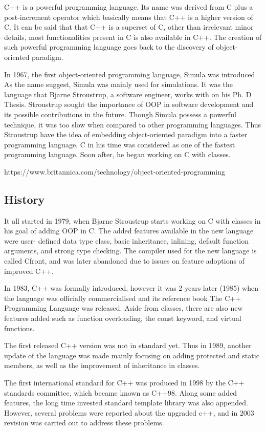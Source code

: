 \documentclass[a4paper, 12pt]{article}
\begin{document}
C++ is a powerful programming language. Its name was derived from C plus a post-increment operator which basically means that C++ is a higher version of C. It can be said that that C++ is a superset of C, other than irrelevant minor details, most functionalities present in C is also available in C++.  The creation of such powerful programming language goes back to the discovery of object-oriented paradigm.  

In 1967, the first object-oriented programming language, Simula was introduced. As the name suggest, Simula was mainly used for simulations. It was the language that Bjarne Stroustrup, a software engineer, works with on his Ph. D Thesis. Stroustrup sought the importance of OOP in software development and its possible contributions in the future. Though Simula possess a powerful technique, it was too slow when compared to other programming languages. Thus Stroustrup have the idea of embedding object-oriented paradigm into a faster programming language. C in his time was considered as one of the fastest programming language. Soon after, he began working on C with classes. 


https://www.britannica.com/technology/object-oriented-programming
\subsection{History}
It all started in 1979, when Bjarne Stroustrup starts working on C with classes in his goal of adding OOP in C. The added features available in the new language were user- defined data type class, basic inheritance, inlining, default function arguments, and strong type checking. The compiler used for the new language is called Cfront, and was later abandoned due to issues on feature adoptions of improved C++. 

In 1983, C++ was formally introduced, however it was 2 years later (1985) when the language was officially commercialised and its reference book The C++ Programming Language was released. Aside from classes, there are also new features added such as function overloading, the const keyword, and virtual functions. 

The first released C++ version was not in standard yet. Thus in 1989, another update of the language was made mainly focusing on adding protected and static members, as well as the improvement of inheritance in classes.  

The first international standard for C++ was produced in 1998 by the C++ standards committee, which became known as C++98. Along some added features, the long time invested standard template library was also appended. However, several problems were reported about the upgraded c++, and in 2003 revision was carried out to address these problems.
\end{document}
